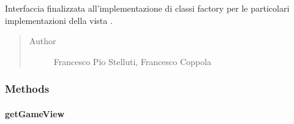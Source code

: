 \documentclass[letterpaper,10pt,italian,openany,oneside]{sphinxmanual}
\begin{document}
\begin{fulllineitems}
\label{\detokenize{source/it/unicam/cs/pa/mastermind/factories/GameViewFactory:it.unicam.cs.pa.mastermind.factories.GameViewFactory}}
Interfaccia finalizzata all’implementazione di classi factory per le particolari implementazioni della vista .
\begin{quote}\begin{description}
\item[{Author}] \leavevmode
Francesco Pio Stelluti, Francesco Coppola

\end{description}\end{quote}

\end{fulllineitems}



\subsubsection{Methods}
\label{\detokenize{source/it/unicam/cs/pa/mastermind/factories/GameViewFactory:methods}}

\paragraph{getGameView}
\label{\detokenize{source/it/unicam/cs/pa/mastermind/factories/GameViewFactory:getgameview}}
\end{document}
